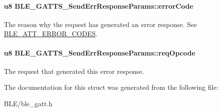 \paragraph[{\texorpdfstring{error\+Code}{errorCode}}]{\setlength{\rightskip}{0pt plus 5cm}u8 B\+L\+E\+\_\+\+G\+A\+T\+T\+S\+\_\+\+Send\+Err\+Response\+Params\+::error\+Code}\hypertarget{struct_b_l_e___g_a_t_t_s___send_err_response_params_a2ae3310941796f5fd1860541c8625f36}{}\label{struct_b_l_e___g_a_t_t_s___send_err_response_params_a2ae3310941796f5fd1860541c8625f36}
The reason why the request has generated an error response. See \hyperlink{group___b_l_e___a_t_t___e_r_r_o_r___c_o_d_e_s}{B\+L\+E\+\_\+\+A\+T\+T\+\_\+\+E\+R\+R\+O\+R\+\_\+\+C\+O\+D\+ES}. 
\paragraph[{\texorpdfstring{req\+Opcode}{reqOpcode}}]{\setlength{\rightskip}{0pt plus 5cm}u8 B\+L\+E\+\_\+\+G\+A\+T\+T\+S\+\_\+\+Send\+Err\+Response\+Params\+::req\+Opcode}\hypertarget{struct_b_l_e___g_a_t_t_s___send_err_response_params_ac65e7133d29ce74d90d7f4ed0528078f}{}\label{struct_b_l_e___g_a_t_t_s___send_err_response_params_ac65e7133d29ce74d90d7f4ed0528078f}
The request that generated this error response. 

The documentation for this struct was generated from the following file\+:\begin{DoxyCompactItemize}
\item 
B\+L\+E/ble\+\_\+gatt.\+h\end{DoxyCompactItemize}
